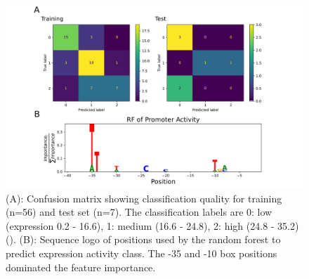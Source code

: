 \documentclass[utf8]{frontiersSCNS} %
\begin{document}
\newpage
\begin{figure}[h!]
    \begin{center}
        \includegraphics[width=.85\linewidth]{Figures/2103_Pput-ConfMat.png}
    \end{center}
    \caption{(A): Confusion matrix showing classification quality for training (n=56) and test set (n=7). The classification labels are 0: low (expression 0.2 - 16.6), 1: medium (16.6 - 24.8), 2: high (24.8 - 35.2)(\citep{Kobbing2020}). (B): Sequence logo of positions used by the random forest to predict expression activity class. The -35 and -10 box positions dominated the feature importance.}
    \label{Fig:PputConfMatr}
\end{figure}
\end{document}

